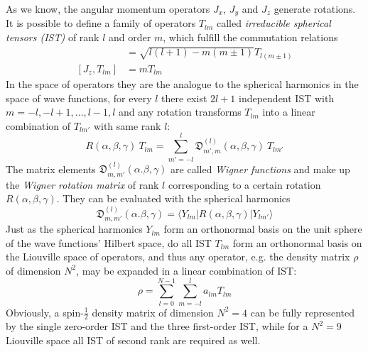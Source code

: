 \documentclass[11.5pt,a4paper]{article}
\begin{document}
As we know, the angular momentum operators $J_x$, $J_y$ and $J_z$ generate rotations. It is possible to define a family of operators $T_{lm}$ called \emph{irreducible spherical tensors (IST)} of rank $l$ and order $m$, which fulfill the commutation relations
\begin{align}
 [J_\pm,T_{lm}] & = \sqrt{l(l+1)-m(m\pm1)} T_{l(m\pm1)} \\
  [J_z, T_{lm}] & = m T_{lm}
  \label{eq-tlm-commutators}
\end{align}
In the space of operators they are the analogue to the spherical harmonics in the space of wave functions, for every $l$ there exist $2l+1$ independent IST with $m = -l, -l+1, \dots , l-1, l$ and any rotation transforms $T_{lm}$ into a linear combination of $T_{lm'}$ with same rank $l$:
\begin{equation}
 R(\alpha,\beta,\gamma) \ T_{lm} = \sum_{m'=-l}^l \mathfrak{D}_{m',m}^{(l)}(\alpha,\beta,\gamma) \ T_{lm'}
  \label{eq-wigner-rotation}
\end{equation}
The matrix elements $\mathfrak{D}_{m,m'}^{(l)}(\alpha.\beta,\gamma)$ are called \emph{Wigner functions} and make up the \emph{Wigner rotation matrix} of rank $l$ corresponding to a certain rotation $R(\alpha,\beta,\gamma)$. They can be evaluated with the spherical harmonics
\begin{equation}
 \mathfrak{D}_{m,m'}^{(l)}(\alpha.\beta,\gamma) = \langle Y_{lm}|R(\alpha,\beta,\gamma)|Y_{lm'} \rangle
\end{equation}
Just as the spherical harmonics $Y_{lm}$ form an orthonormal basis on the unit sphere of the wave functions' Hilbert space, do all IST $T_{lm}$ form an orthonormal basis on the Liouville space of operators, and thus any operator, e.g. the density matrix $\rho$ of dimension $N^2$, may be expanded in a linear combination of IST:
\begin{equation}
 \rho = \sum_{l=0}^{N-1} \sum_{m=-l}^l a_{lm} T_{lm}
\end{equation}
Obviously, a spin-$\tfrac{1}{2}$ density matrix of dimension $N^2=4$ can be fully represented by the single zero-order IST and the three first-order IST, while for a $N^2=9$ Liouville space all IST of second rank are required as well. 
\end{document}
